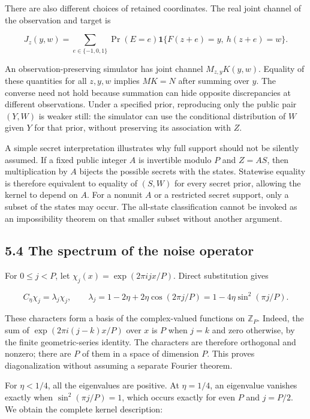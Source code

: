 \documentclass[
]{article}
\begin{document}
There are also different choices of retained coordinates. The real joint
channel of the observation and target is

\[
J_z(y,w)=\sum_{e\in\{-1,0,1\}}\Pr(E=e)
\mathbf1\{F(z+e)=y,\ h(z+e)=w\}.
\]

An observation-preserving simulator has joint channel \(M_{z,y}K(y,w)\).
Equality of these quantities for all \(z,y,w\) implies \(MK=N\) after
summing over \(y\). The converse need not hold because summation can
hide opposite discrepancies at different observations. Under a specified
prior, reproducing only the public pair \((Y,W)\) is weaker still: the
simulator can use the conditional distribution of \(W\) given \(Y\) for
that prior, without preserving its association with \(Z\).

A simple secret interpretation illustrates why full support should not
be silently assumed. If a fixed public integer \(A\) is invertible
modulo \(P\) and \(Z=AS\), then multiplication by \(A\) bijects the
possible secrets with the states. Statewise equality is therefore
equivalent to equality of \((S,W)\) for every secret prior, allowing the
kernel to depend on \(A\). For a nonunit \(A\) or a restricted secret
support, only a subset of the states may occur. The all-state
classification cannot be invoked as an impossibility theorem on that
smaller subset without another argument.

\subsection{5.4 The spectrum of the noise
operator}\label{the-spectrum-of-the-noise-operator}

For \(0\le j<P\), let \(\chi_j(x)=\exp(2\pi i jx/P)\). Direct
substitution gives

\[
C_\eta\chi_j=\lambda_j\chi_j,
\qquad \lambda_j=1-2\eta+2\eta\cos(2\pi j/P)
=1-4\eta\sin^2(\pi j/P).
\]

These characters form a basis of the complex-valued functions on
\(\mathbb Z_P\). Indeed, the sum of \(\exp(2\pi i (j-k)x/P)\) over \(x\)
is \(P\) when \(j=k\) and zero otherwise, by the finite geometric-series
identity. The characters are therefore orthogonal and nonzero; there are
\(P\) of them in a space of dimension \(P\). This proves diagonalization
without assuming a separate Fourier theorem.

For \(\eta<1/4\), all the eigenvalues are positive. At \(\eta=1/4\), an
eigenvalue vanishes exactly when \(\sin^2(\pi j/P)=1\), which occurs
exactly for even \(P\) and \(j=P/2\). We obtain the complete kernel
description:
\end{document}
